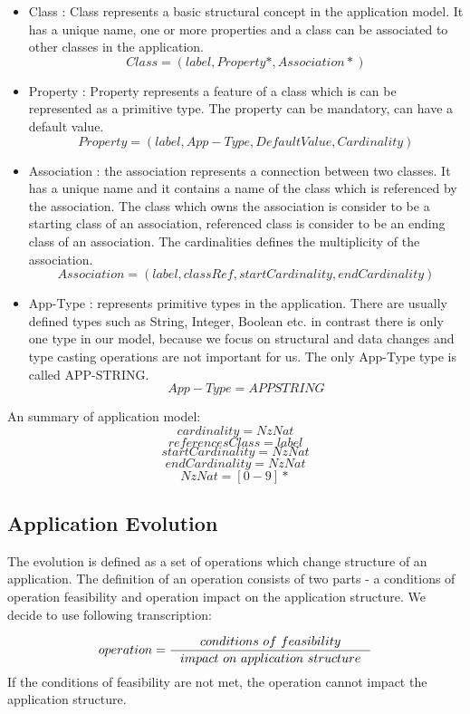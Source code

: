 \documentclass[11pt]{article}
\begin{document}
\begin{itemize}
	\item Class : Class represents a basic structural concept in the application model. It has a unique name, one or more properties and a class can be associated to other classes in the application.  
$$
Class = (label, Property*, Association*)
$$
	\item Property : Property represents a feature of  a class which is can be represented as a primitive type. The property can be mandatory, can have a default value.
$$
Property = (label, App-Type, DefaultValue, Cardinality)
$$
	\item Association : the association represents a connection between two classes. It has a unique name and it contains a name of the class which is referenced by the association. The class which owns the association is consider to be a starting class of an association, referenced class is consider to be an ending class of an association. The cardinalities defines the multiplicity of the association.
$$
Association = (label, classRef, startCardinality, endCardinality)
$$
	\item App-Type : represents primitive types in the application. There are usually defined types such as String, Integer, Boolean etc. in contrast there is only one type in our model, because we focus on structural and data changes and type casting operations are not important for us. The only App-Type type is called APP-STRING.
$$
App-Type = APPSTRING
$$
\end{itemize}
An summary of application model:
$$
cardinality = NzNat
$$
$$
referencesClass = label
$$
$$
startCardinality = NzNat
$$
$$
endCardinality = NzNat
$$
$$
NzNat = [0 - 9]*
$$

\subsection{Application Evolution}
\label{sec:appEvolution}

The evolution is defined as a set of operations which change structure of an application. The definition of an operation consists of two parts - a conditions of operation feasibility and operation impact on the application structure. We decide to use following transcription:

$$
operation = \inference{conditions$ $of$ $feasibility}{impact$ $on$ $application$ $structure}
$$
If the conditions of feasibility are not met, the operation cannot impact the application structure.
\end{document}
